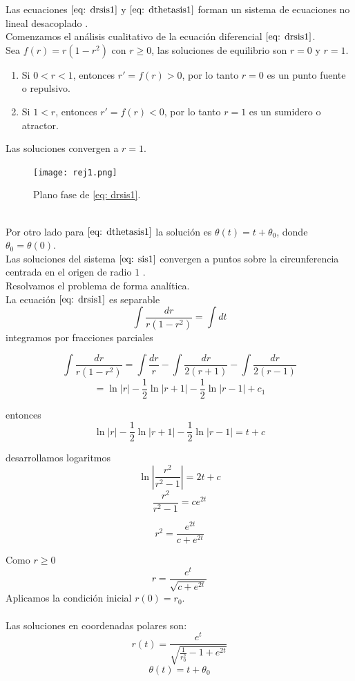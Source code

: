 Las ecuaciones $\eqref{eq: drsis1}$ y $\eqref{eq: dthetasis1}$
forman un sistema de ecuaciones no lineal desacoplado \cite{strogatz2018nonlinear}.\\

Comenzamos el análisis cualitativo de la ecuación diferencial $\eqref{eq: drsis1}$.\\

Sea $f(r)=r(1-r^2)$ con $r\geq0$, las soluciones de equilibrio son $r=0$ y $r=1$.
\begin{enumerate}
	\item Si $0<r<1$, entonces $r'=f(r)>0$, por lo tanto $r=0$ es un punto fuente o repulsivo.
	\item Si $1<r$, entonces $r'=f(r)<0$, por lo tanto $r=1$ es un sumidero o atractor.
\end{enumerate}

Las soluciones convergen a $r=1$.
\begin{figure}[h]
	\centering
	\texttt{[image: rej1.png]}
	\caption{Plano fase de \eqref{eq: drsis1}.}
\end{figure}\\

Por otro lado para $\eqref{eq: dthetasis1}$ la solución es $\theta(t)=t+\theta_0$,
donde $\theta_0=\theta(0)$.\\

Las soluciones del sistema $\eqref{eq: sis1}$ convergen a puntos sobre la
circunferencia centrada en el origen de radio $1$ \cite{wiggins2003introduction}.\\

Resolvamos el problema de forma analítica.\\

La ecuación $\eqref{eq: drsis1}$ es separable
$$\int\frac{dr}{r(1-r^2)}=\int dt$$
integramos por fracciones parciales

$$\int\frac{dr}{r(1-r^2)}=\int\frac{dr}{r}-\int\frac{dr}{2(r+1)}-\int\frac{dr}{2(r-1)}$$
$$=\ln |r|-\frac{1}{2}\ln|r+1|-\frac{1}{2}\ln|r-1|+c_1$$

entonces
$$\ln |r|-\frac{1}{2}\ln|r+1|-\frac{1}{2}\ln|r-1|=t+c$$

desarrollamos logaritmos
$$\ln\left\lvert\frac{r^2}{r^2-1}\right\rvert=2t+c$$
$$\frac{r^2}{r^2-1}=ce^{2t}$$

$$r^2=\frac{e^{2t}}{c+e^{2t}}$$

Como $r\geq 0$
$$r=\frac{e^t}{\sqrt{c+e^{2t}}}$$
Aplicamos la condición inicial $r(0)=r_0$.\\
\\Las soluciones en coordenadas polares son:
\begin{equation}\label{eq: rsis1}
	r(t)=\frac{e^t}{\sqrt{\frac{1}{r_0^2}-1+e^{2t}}}
\end{equation}
\begin{equation}\label{eq: thetasis1}
	\theta(t)=t+\theta_0
\end{equation}

